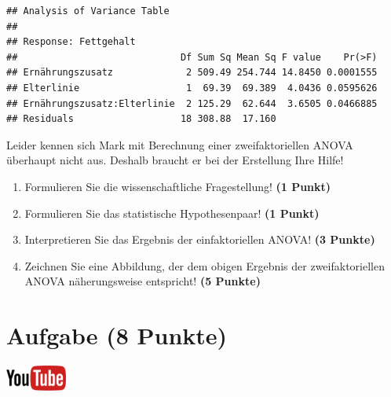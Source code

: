 \documentclass[a4paper, 9pt]{scrartcl}\usepackage[]{graphicx}\usepackage[]{xcolor}
\makeatletter
\newenvironment{kframe}{%
 \def\at@end@of@kframe{}%
 \ifinner\ifhmode%
  \def\at@end@of@kframe{\end{minipage}}%
  \begin{minipage}{\columnwidth}%
 \fi\fi%
 \def\FrameCommand##1{\hskip\@totalleftmargin \hskip-\fboxsep
 \colorbox{shadecolor}{##1}\hskip-\fboxsep
     \hskip-\linewidth \hskip-\@totalleftmargin \hskip\columnwidth}%
 \MakeFramed {\advance\hsize-\width
   \@totalleftmargin\z@ \linewidth\hsize
   \@setminipage}}%
 {\par\unskip\endMakeFramed%
 \at@end@of@kframe}
\newenvironment{knitrout}{}{} %
\makeatother
\begin{document}
\begin{knitrout}
\color{fgcolor}\begin{kframe}
\begin{verbatim}
## Analysis of Variance Table
## 
## Response: Fettgehalt
##                             Df Sum Sq Mean Sq F value    Pr(>F)
## Ernährungszusatz             2 509.49 254.744 14.8450 0.0001555
## Elterlinie                   1  69.39  69.389  4.0436 0.0595626
## Ernährungszusatz:Elterlinie  2 125.29  62.644  3.6505 0.0466885
## Residuals                   18 308.88  17.160
\end{verbatim}
\end{kframe}
\end{knitrout}

\vspace{1ex}

Leider kennen sich Mark mit Berechnung einer zweifaktoriellen ANOVA überhaupt nicht aus. Deshalb braucht er bei der Erstellung Ihre Hilfe! 

\begin{enumerate}
  \item Formulieren Sie die wissenschaftliche Fragestellung! \textbf{(1 Punkt)}
  \item Formulieren Sie das statistische Hypothesenpaar! \textbf{(1 Punkt)}
\item Interpretieren Sie das Ergebnis der einfaktoriellen ANOVA! \textbf{(3 Punkte)} 
\item Zeichnen Sie eine Abbildung, der dem obigen Ergebnis der
  zweifaktoriellen ANOVA näherungsweise entspricht! \textbf{(5 Punkte)}
\end{enumerate}
 
\clearpage

\section{Aufgabe \hfill (8 Punkte)}


\hfill\href{https://youtu.be/FjjJXkFJfIY}{\includegraphics[width =
  2cm]{img/youtube}}\\[1Ex]
\end{document}
